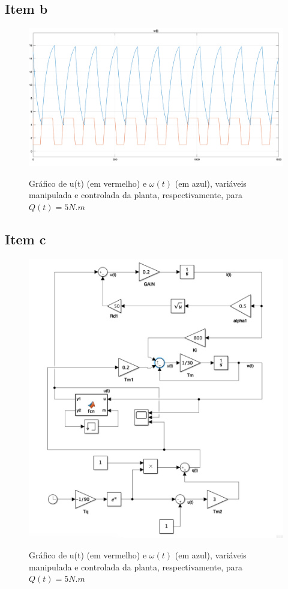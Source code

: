 \documentclass[11pt]{article}
\begin{document}
\subsection{Item b}
\begin{figure}[H]
	\centering
	{\includegraphics[width=\textwidth]
		{assets/q4_b_plot.png}}
	\caption{Gráfico de u(t) (em vermelho) e $\omega(t)$ (em azul), variáveis manipulada e controlada da planta, respectivamente, para $Q(t) = 5 N.m$}
\end{figure}

\subsection{Item c}

\begin{figure}[H]
	\centering
	{\includegraphics[width=\textwidth]
		{assets/q4_c_control_schema.jpg}}
	\caption{Gráfico de u(t) (em vermelho) e $\omega(t)$ (em azul), variáveis manipulada e controlada da planta, respectivamente, para $Q(t) = 5 N.m$}
\end{figure}
\end{document}
